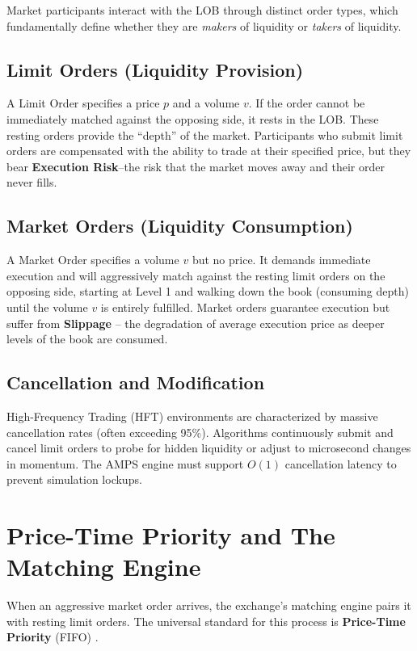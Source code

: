 Market participants interact with the LOB through distinct order types, which fundamentally define whether they are \textit{makers} of liquidity or \textit{takers} of liquidity.

\subsection{Limit Orders (Liquidity Provision)}
A Limit Order specifies a price $p$ and a volume $v$. If the order cannot be immediately matched against the opposing side, it rests in the LOB. These resting orders provide the ``depth'' of the market. Participants who submit limit orders are compensated with the ability to trade at their specified price, but they bear \textbf{Execution Risk}--the risk that the market moves away and their order never fills.

\subsection{Market Orders (Liquidity Consumption)}
A Market Order specifies a volume $v$ but no price. It demands immediate execution and will aggressively match against the resting limit orders on the opposing side, starting at Level 1 and walking down the book (consuming depth) until the volume $v$ is entirely fulfilled. Market orders guarantee execution but suffer from \textbf{Slippage} -- the degradation of average execution price as deeper levels of the book are consumed.

\subsection{Cancellation and Modification}
High-Frequency Trading (HFT) environments are characterized by massive cancellation rates (often exceeding 95\%). Algorithms continuously submit and cancel limit orders to probe for hidden liquidity or adjust to microsecond changes in momentum. The AMPS engine must support $O(1)$ cancellation latency to prevent simulation lockups.

\section{Price-Time Priority and The Matching Engine}

When an aggressive market order arrives, the exchange's matching engine pairs it with resting limit orders. The universal standard for this process is \textbf{Price-Time Priority} (FIFO) \cite{ohara1995market}.

